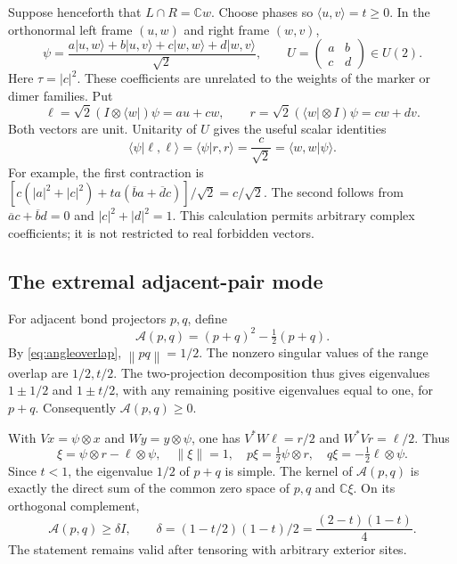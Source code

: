 \documentclass[11pt,a4paper]{article}
\theoremstyle{remark}\newtheorem{remark}[theorem]{Remark}
\newcommand{\C}{\mathbb C}
\newcommand{\ket}[1]{\lvert #1\rangle}
\newcommand{\bra}[1]{\langle #1\rvert}
\newcommand{\norm}[1]{\left\lVert #1\right\rVert}
\begin{document}
Suppose henceforth that $L\cap R=\C w$. Choose phases so $\langle u,v\rangle=t\ge0$. In the orthonormal left frame $(u,w)$ and right frame $(w,v)$,
\begin{equation}\label{eq:Uframe}
 \psi=\frac{a\ket{u,w}+b\ket{u,v}+c\ket{w,w}+d\ket{w,v}}{\sqrt2},
 \qquad U=\begin{pmatrix}a&b\\c&d\end{pmatrix}\in U(2).
\end{equation}
Here $\tau=|c|^2$. These coefficients are unrelated to the weights of the marker or dimer families. Put
\begin{equation}\label{eq:lr}
 \ell=\sqrt2(I\otimes\bra w)\psi=a u+c w,
 \qquad r=\sqrt2(\bra w\otimes I)\psi=c w+d v.
\end{equation}
Both vectors are unit. Unitarity of $U$ gives the useful scalar identities
\begin{equation}\label{eq:scalars}
 \langle\psi|\ell,\ell\rangle=\langle\psi|r,r\rangle
 =\frac c{\sqrt2}=\langle w,w|\psi\rangle.
\end{equation}
For example, the first contraction is
$[c(|a|^2+|c|^2)+ta(\overline b a+\overline d c)]/\sqrt2=c/\sqrt2$.
The second follows from $\overline a c+\overline b d=0$ and $|c|^2+|d|^2=1$. This calculation permits arbitrary complex coefficients; it is not restricted to real forbidden vectors.

\subsection{The extremal adjacent-pair mode}
For adjacent bond projectors $p,q$, define
\begin{equation}\label{eq:Adef}
 \mathcal A(p,q)=(p+q)^2-\tfrac12(p+q).
\end{equation}
By \eqref{eq:angleoverlap}, $\norm{pq}=1/2$. The nonzero singular values of the range overlap are $1/2,t/2$. The two-projection decomposition thus gives eigenvalues $1\pm1/2$ and $1\pm t/2$, with any remaining positive eigenvalues equal to one, for $p+q$. Consequently $\mathcal A(p,q)\ge0$.

With $Vx=\psi\otimes x$ and $Wy=y\otimes\psi$, one has $V^*W\ell=r/2$ and $W^*Vr=\ell/2$. Thus
\begin{equation}\label{eq:xi}
 \xi=\psi\otimes r-\ell\otimes\psi,
 \quad \norm\xi=1,
 \quad p\xi=\tfrac12\psi\otimes r,
 \quad q\xi=-\tfrac12\ell\otimes\psi.
\end{equation}
Since $t<1$, the eigenvalue $1/2$ of $p+q$ is simple. The kernel of $\mathcal A(p,q)$ is exactly the direct sum of the common zero space of $p,q$ and $\C\xi$. On its orthogonal complement,
\begin{equation}\label{eq:delta}
 \mathcal A(p,q)\ge \delta I,
 \qquad \delta=(1-t/2)(1-t)/2=\frac{(2-t)(1-t)}4.
\end{equation}
The statement remains valid after tensoring with arbitrary exterior sites.
\end{document}
